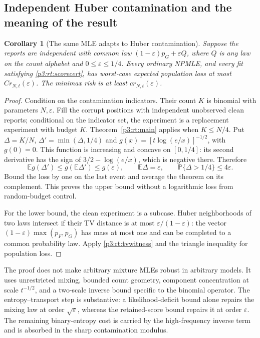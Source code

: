 \documentclass[11pt,a4paper]{article}
\newtheorem{corollary}[theorem]{Corollary}
\theoremstyle{definition}
\theoremstyle{remark}
\numberwithin{equation}{section}
\begin{document}
\subsection{Independent Huber contamination and the meaning of the result}

\begin{corollary}[The same MLE adapts to Huber contamination]
\label{p3:rt:huber}
Suppose the reports are independent with common law
$(1-\varepsilon)p_G+\varepsilon Q$, where $Q$ is any law on the
count alphabet and $0\le\varepsilon\le1/4$.
Every ordinary NPMLE, and every fit satisfying
\eqref{p3:rt:scorecert}, has worst-case expected population loss at most
$Cr_{N,t}(\varepsilon)$.  The minimax risk is at least
$cr_{N,t}(\varepsilon)$.
\end{corollary}
\begin{proof}
Condition on the contamination indicators.  Their count
$K$ is binomial with parameters $N,\varepsilon$.  Fill the corrupt
positions with independent unobserved clean reports; conditional on
the indicator set, the experiment is a replacement experiment with
budget $K$.  Theorem~\ref{p3:rt:main} applies when $K\le N/4$.
Put $\Delta=K/N$, $\Delta'=\min(\Delta,1/4)$ and
$g(x)=[t\log(e/x)]^{-1/2}$, with $g(0)=0$.
This function is increasing and concave on $[0,1/4]$: its second
derivative has the sign of $3/2-\log(e/x)$, which is negative there.
Therefore
\[
 \mathbb E g(\Delta')\le g(\mathbb E\Delta')\le g(\varepsilon),
 \qquad\mathbb E\Delta=\varepsilon,
 \qquad\mathbb P\{\Delta>1/4\}\le4\varepsilon.
\]
Bound the loss by one on the last event and average the theorem on
its complement.  This proves the upper bound without a logarithmic
loss from random-budget control.

For the lower bound, the clean experiment is a subcase.  Huber
neighborhoods of two laws intersect if their TV distance is at most
$\varepsilon/(1-\varepsilon)$: the vector
$(1-\varepsilon)\max(p_F,p_G)$ has mass at most one and can be
completed to a common probability law.  Apply
\eqref{p3:rt:tvwitness} and the triangle inequality for population loss.
\end{proof}

The proof does not make arbitrary mixture MLEs robust in arbitrary
models.  It uses unrestricted mixing, bounded count geometry,
component concentration at scale $t^{-1/2}$, and a two-scale inverse
bound specific to the binomial operator.  The entropy--transport step
is substantive: a likelihood-deficit bound alone repairs the mixing
law at order $\sqrt\varepsilon$, whereas the retained-score bound
repairs it at order $\varepsilon$.  The remaining binary-entropy cost
is carried by the high-frequency inverse term and is absorbed in the
sharp contamination modulus.
\end{document}
